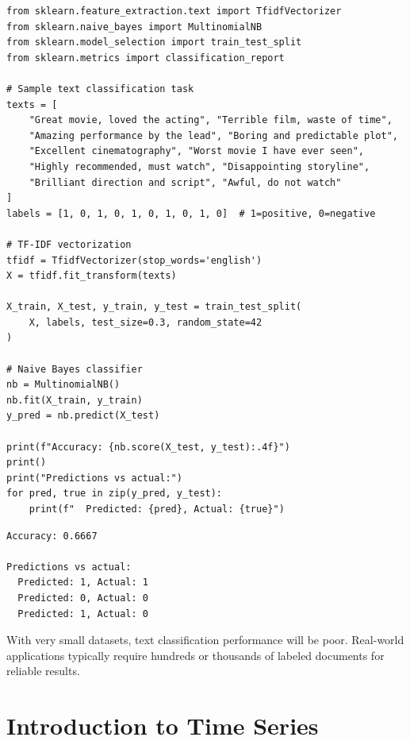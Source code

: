 \begin{codeblock}[title=\textbf{Python}]
\begin{verbatim}
from sklearn.feature_extraction.text import TfidfVectorizer
from sklearn.naive_bayes import MultinomialNB
from sklearn.model_selection import train_test_split
from sklearn.metrics import classification_report

# Sample text classification task
texts = [
    "Great movie, loved the acting", "Terrible film, waste of time",
    "Amazing performance by the lead", "Boring and predictable plot",
    "Excellent cinematography", "Worst movie I have ever seen",
    "Highly recommended, must watch", "Disappointing storyline",
    "Brilliant direction and script", "Awful, do not watch"
]
labels = [1, 0, 1, 0, 1, 0, 1, 0, 1, 0]  # 1=positive, 0=negative

# TF-IDF vectorization
tfidf = TfidfVectorizer(stop_words='english')
X = tfidf.fit_transform(texts)

X_train, X_test, y_train, y_test = train_test_split(
    X, labels, test_size=0.3, random_state=42
)

# Naive Bayes classifier
nb = MultinomialNB()
nb.fit(X_train, y_train)
y_pred = nb.predict(X_test)

print(f"Accuracy: {nb.score(X_test, y_test):.4f}")
print()
print("Predictions vs actual:")
for pred, true in zip(y_pred, y_test):
    print(f"  Predicted: {pred}, Actual: {true}")
\end{verbatim}
\end{codeblock}

\begin{codeoutput}
\begin{verbatim}
Accuracy: 0.6667

Predictions vs actual:
  Predicted: 1, Actual: 1
  Predicted: 0, Actual: 0
  Predicted: 1, Actual: 0
\end{verbatim}
\end{codeoutput}

\begin{warning}
With very small datasets, text classification performance will be poor. Real-world applications typically require hundreds or thousands of labeled documents for reliable results.
\end{warning}

\section{Introduction to Time Series}
\label{sec:intro_timeseries}

